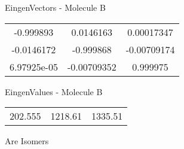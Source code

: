 \begin{multicols}{2}
\begin{center}
\vtab
 EingenVectors - Molecule B     \\
\vtab
\begin{tabular}{|c c c|}
-0.999893	 & 	0.0146163	 & 	0.00017347	 \\
-0.0146172	 & 	-0.999868	 & 	-0.00709174	 \\
6.97925e-05	 & 	-0.00709352	 & 	0.999975
\end{tabular}

\vtab
 EingenValues - Molecule B     \\
\vtab
\begin{tabular}{|c c c|}
202.555	 & 	1218.61	 & 	1335.51
\end{tabular}

\end{center}
\end{multicols}
\begin{center}
\vtab
\vtab
\textcolor{NavyBlue}{\Large Are Isomers}
\end{center}
\newpage

